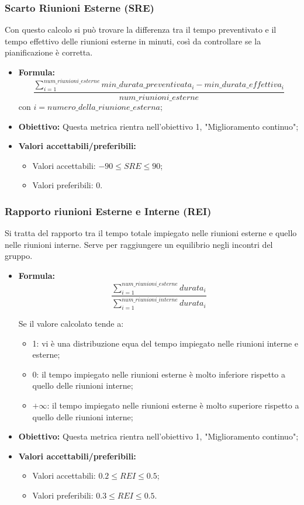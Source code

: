 \subsubsection{Scarto Riunioni Esterne (SRE)}
	Con questo calcolo si può trovare la differenza tra il tempo preventivato e il tempo effettivo delle riunioni esterne in minuti, così da controllare se la pianificazione è corretta.
\begin{itemize}
	\item{\textbf{Formula:}}\[\frac{\sum_{i=1}^{num\_riunioni\_esterne}min\_durata\_preventivata_i-min\_durata\_effettiva_i}{num\_riunioni\_esterne}\]
	con $i = {numero\_della\_riunione\_esterna}$;
	\item {\textbf{Obiettivo: }}Questa metrica rientra nell'obiettivo 1, "Miglioramento continuo";
	\item {\textbf{Valori accettabili/preferibili: }}
		\begin{itemize}
			\item Valori accettabili: $-90 \leq SRE \leq 90$;
			\item Valori preferibili: 0.
		\end{itemize}
\end{itemize}

\subsubsection{Rapporto riunioni Esterne e Interne (REI)}
	Si tratta del rapporto tra il tempo totale impiegato nelle riunioni esterne e quello nelle riunioni interne. Serve per raggiungere un equilibrio negli incontri del gruppo.
\begin{itemize}	
	\item {\textbf{Formula: }}\[\frac{\sum_{i=1}^{num\_riunioni\_esterne} durata_i}{\sum_{i=1}^{num\_riunioni\_interne} durata_i}\]
	
	Se il valore calcolato tende a:
	\begin{itemize}
		\item 1: vi è una distribuzione equa del tempo impiegato nelle riunioni interne e esterne;
		\item 0: il tempo impiegato nelle riunioni esterne è molto inferiore rispetto a quello delle riunioni interne;
		\item $+\infty$: il tempo impiegato nelle riunioni esterne è molto superiore rispetto a quello delle riunioni interne;
	\end{itemize}
	\item {\textbf{Obiettivo: }}Questa metrica rientra nell'obiettivo 1, "Miglioramento continuo";
	\item {\textbf{Valori accettabili/preferibili: }}
	\begin{itemize}
		\item Valori accettabili: $0.2 \leq REI \leq 0.5$;
		\item Valori preferibili: $0.3 \leq REI \leq 0.5$.
	\end{itemize}
\end{itemize}

